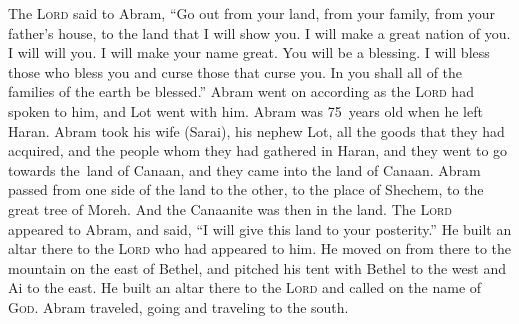 
\begin{inparaenum}
     The \textsc{Lord} said to Abram, ``Go out from your land, from your family, from your father's house, to the land that I will show you.%
     I will make a great nation of you. I will will you. I will make your name great. You will be a blessing.%
     I will bless those who bless you and curse those that curse you. In you shall all of the families of the earth be blessed.''%
     Abram went on according as the \textsc{Lord} had spoken to him, and Lot went with him. Abram was 75~years old when he left Haran.%
     Abram took his wife (Sarai), his nephew Lot, all the goods that they had acquired, and the people whom they had gathered in Haran, and they went to go towards the\understood\ land of Canaan, and they came into the land of Canaan.%
     Abram passed from one side of the land to the other, to the place of Shechem, to the great tree of Moreh. And the Canaanite was then in the land.%
     The \textsc{Lord} appeared to Abram, and said, ``I will give this land to your posterity.'' He built an altar there to the \textsc{Lord} who had appeared to him.%
     He moved on from there to the mountain on the east of Bethel, and pitched his tent with Bethel to the west and Ai to the east. He built an altar there to the \textsc{Lord} and called on the name of \textsc{God}.%
     Abram traveled, going and traveling to the south.%
    

\end{inparaenum}
